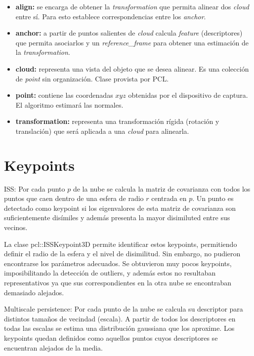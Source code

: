 		\begin{itemize}
			\item {\bfseries align:} se encarga de obtener la \emph{transformation} que
				permita alinear dos \emph{cloud} entre sí.  Para esto establece
				correspondencias entre los \emph{anchor}.
			\item {\bfseries anchor:} a partir de puntos salientes de \emph{cloud} calcula
				\emph{feature} (descriptores) que permita asociarlos y un
				\emph{reference\_frame} para obtener una estimación de la
				\emph{transformation}.
			\item {\bfseries cloud:} representa una vista del objeto que se desea alinear.
				Es una colección de \emph{point} sin organización. Clase
				provista por PCL.
			\item {\bfseries point:} contiene las coordenadas $xyz$ obtenidas por el
				dispositivo de captura. El algoritmo estimará las normales.
			\item {\bfseries transformation:} representa una transformación rígida
				(rotación y translación) que será aplicada a una \emph{cloud}
				para alinearla.
		\end{itemize}

	\section{Keypoints}
		ISS:
		Por cada punto $p$ de la nube se calcula la matriz de covarianza con
		todos los puntos que caen dentro de una esfera de radio $r$ centrada en
		$p$.
		Un punto es detectado como keypoint si los eigenvalores de esta matriz
		de covarianza son suficientemente disímiles y además presenta la mayor disimiluted entre sus vecinos.

		La clase pcl::ISSKeypoint3D permite identificar estos keypoints, permitiendo definir el radio de la esfera y el nivel de disimilitud.
		Sin embargo, no pudieron encontrarse los parámetros adecuados.
		Se obtuvieron muy pocos keypoints, imposibilitando la detección de outliers,
		y además estos no resultaban representativos ya que sus correspondientes en la otra nube se encontraban demasiado alejados.

		Multiscale persistence:
		Por cada punto de la nube se calcula su descriptor para distintos tamaños de vecindad (escala).
		A partir de todos los descriptores en todas las escalas se estima una distribución gaussiana que los aproxime.
		Los keypoints quedan definidos como aquellos puntos cuyos descriptores se encuentran alejados de la media.

